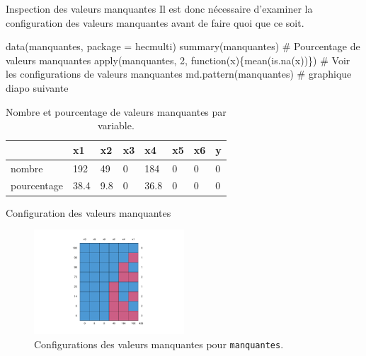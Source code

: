 \documentclass[
  ignorenonframetext,
]{beamer}
\newenvironment{Shaded}{\begin{snugshade}}{\end{snugshade}}
\newcommand{\AttributeTok}[1]{\textcolor[rgb]{0.40,0.45,0.13}{#1}}
\newcommand{\CommentTok}[1]{\textcolor[rgb]{0.37,0.37,0.37}{#1}}
\newcommand{\ControlFlowTok}[1]{\textcolor[rgb]{0.00,0.23,0.31}{#1}}
\newcommand{\DecValTok}[1]{\textcolor[rgb]{0.68,0.00,0.00}{#1}}
\newcommand{\FunctionTok}[1]{\textcolor[rgb]{0.28,0.35,0.67}{#1}}
\newcommand{\NormalTok}[1]{\textcolor[rgb]{0.00,0.23,0.31}{#1}}
\newcommand{\StringTok}[1]{\textcolor[rgb]{0.13,0.47,0.30}{#1}}
\begin{document}
\begin{frame}[fragile]{Inspection des valeurs manquantes}
\protect\hypertarget{inspection-des-valeurs-manquantes}{}
Il est donc nécessaire d'examiner la configuration des valeurs
manquantes avant de faire quoi que ce soit.

\begin{Shaded}
\begin{Highlighting}[numbers=left,,]
\FunctionTok{data}\NormalTok{(manquantes, }\AttributeTok{package =} \StringTok{\textquotesingle{}hecmulti\textquotesingle{}}\NormalTok{)}
\FunctionTok{summary}\NormalTok{(manquantes)}
\CommentTok{\# Pourcentage de valeurs manquantes}
\FunctionTok{apply}\NormalTok{(manquantes, }\DecValTok{2}\NormalTok{, }\ControlFlowTok{function}\NormalTok{(x)\{}\FunctionTok{mean}\NormalTok{(}\FunctionTok{is.na}\NormalTok{(x))\})}
\CommentTok{\# Voir les configurations de valeurs manquantes}
\FunctionTok{md.pattern}\NormalTok{(manquantes) }\CommentTok{\# graphique diapo suivante}
\end{Highlighting}
\end{Shaded}

\hypertarget{tbl-manquantes-univ}{}
\begin{table}
\caption{\label{tbl-manquantes-univ}Nombre et pourcentage de valeurs manquantes par variable. }\tabularnewline

\centering
\begin{tabular}{llllllll}
\toprule
  & x1 & x2 & x3 & x4 & x5 & x6 & y\\
\midrule
nombre & 192 & 49 & 0 & 184 & 0 & 0 & 0\\
pourcentage & 38.4 & 9.8 & 0 & 36.8 & 0 & 0 & 0\\
\bottomrule
\end{tabular}
\end{table}
\end{frame}

\begin{frame}[fragile]{Configuration des valeurs manquantes}
\protect\hypertarget{configuration-des-valeurs-manquantes}{}
\begin{figure}

{\centering \includegraphics[width=0.5\textwidth,height=\textheight]{MATH60602-diapos7_files/figure-beamer/fig-manquantes2-1.pdf}

}

\caption{\label{fig-manquantes2}Configurations des valeurs manquantes
pour \texttt{manquantes}.}

\end{figure}
\end{frame}
\end{document}
